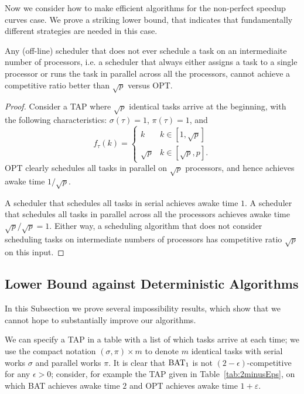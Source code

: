 Now we consider how to make efficient algorithms for the
non-perfect speedup curves case. We prove a striking lower bound,
that indicates that fundamentally different strategies are needed
in this case.
\begin{proposition}
  Any (off-line) scheduler that does not ever schedule a task on
  an intermediaite number of processors, i.e. a scheduler that
  always either assigns a task to a single processor or runs the
  task in parallel across all the processors, cannot achieve a
  competitive ratio better than $\sqrt{p}$ versus OPT.
\end{proposition}
\begin{proof}
  Consider a TAP where $\sqrt{p}$ identical tasks arrive at the
  beginning, with the following characteristics: $\sigma(\tau) =
  1$, $\pi(\tau) = 1$, and 
  $$
  f_\tau(k) = 
  \begin{cases}
    k & k \in [1,\sqrt{p}]\\
    \sqrt{p} & k \in [\sqrt{p}, p].
  \end{cases}$$
  OPT clearly schedules all tasks in parallel on $\sqrt{p}$
  processors, and hence achieves awake time $1/\sqrt{p}$.

  A scheduler that schedules all tasks in serial achieves awake
  time $1$. A scheduler that schedules all tasks in parallel
  across all the processors achieves awake time
  $\sqrt{p}/\sqrt{p} = 1.$
  Either way, a scheduling algorithm that does not consider
  scheduling tasks on intermediate numbers of processors has
  competitive ratio $\sqrt{p}$ on this input.

\end{proof}


\subsection{Lower Bound against Deterministic Algorithms}
In this Subsection we prove several impossibility results, which
show that we cannot hope to substantially improve our algorithms.

We can specify a TAP in a table with a list of which tasks arrive
at each time; we use the compact notation $(\sigma, \pi)\times m$
to denote $m$ identical tasks with serial works $\sigma$ and
parallel works $\pi$. It is clear that $\operatorname{\text{BAT}}_1$ is not
$(2-\epsilon)$-competitive for any $\epsilon > 0$; consider, for
example the TAP given in Table~\ref{tab:2minusEps}, on which BAT
achieves awake time $2$ and OPT achieves awake time
$1+\varepsilon$.


